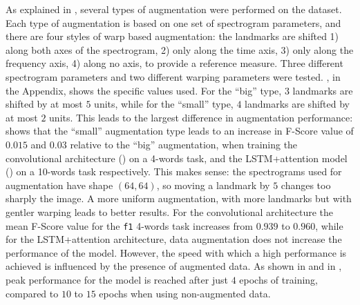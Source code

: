 As explained in , several types of augmentation
were performed on the dataset.
%
%
Each type of augmentation is based on one set of spectrogram parameters, and
there are four styles of warp based augmentation: the landmarks are shifted 1)
along both axes of the spectrogram, 2) only along the time axis, 3) only along
the frequency axis, 4) along no axis, to provide a reference measure. Three
different spectrogram parameters and two different warping parameters were
tested. , in the Appendix, shows the specific values used.
For the ``big'' type, $3$ landmarks are shifted by at most $5$ units, while for
the ``small'' type, $4$ landmarks are shifted by at most $2$ units.
This leads to the largest difference in augmentation performance:
 shows that the ``small''
augmentation type leads to an increase in F-Score value of $0.015$ and $0.03$
relative to the ``big'' augmentation, when training the convolutional
architecture () on a 4-words task, and the
LSTM+attention model () on a 10-words task
respectively.
%
This makes sense: the spectrograms used for augmentation have shape $(64, 64)$,
so moving a landmark by $5$ changes too sharply the image. A more uniform
augmentation, with more landmarks but with gentler warping leads to better
results.
%
For the convolutional architecture the mean F-Score value for the \texttt{f1}
4-words task increases from $0.939$ to $0.960$, while for the LSTM+attention
architecture, data augmentation does not increase the performance of the model.
However, the speed with which a high performance is achieved is influenced by
the presence of augmented data. As shown in
 and in
, peak performance for the model is
reached after just $4$ epochs of training, compared to $10$ to $15$ epochs when
using non-augmented data.

